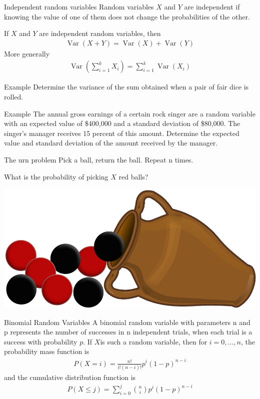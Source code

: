 \documentclass{beamer}
\newcommand{\Var}{\operatorname{Var}}
\begin{document}
\begin{frame}{Independent random variables}
  Random variables $X$ and $Y$ are \alert{independent} if knowing the value of one of them
  does not change the probabilities of the other.

  If $X$ and $Y$ are independent random variables, then
  \begin{align*}
    \Var(X + Y) = \Var(X) + \Var(Y )
  \end{align*}
  More generally
  \begin{align*}
    \Var\left( \sum_{i=1}^k X_i \right) = \sum_{i=1}^k \Var (X_i)
  \end{align*}
\end{frame}

\begin{frame}[t]{Example}
  Determine the variance of the sum obtained when a pair of fair dice is rolled.
\end{frame}

\begin{frame}[t]{Example}
  The annual gross earnings of a certain rock singer are a random variable with
  an expected value of \$400,000 and a standard deviation of \$80,000. The
  singer’s manager receives 15 percent of this amount. Determine the expected
  value and standard deviation of the amount received by the manager.
\end{frame}

\begin{frame}{The urn problem}
  Pick a ball, return the ball. Repeat n times.

  What is the probability of picking $X$ red balls?

  \includegraphics[width=\linewidth]{urn2_small}
\end{frame}

\begin{frame}{Binomial Random Variables}
  A \alert{binomial random variable} with parameters \alert{n} and \alert{p}
  represents the number of \alert{successes} in \alert{n} independent
  \alert{trials}, when each trial is a success with probability $p$.  If $X$is
  such a random variable, then for $i = 0, \ldots , n$, the probability mass
  function is
  \begin{align*}
    P(X=i) = \frac{n!}{i!(n-i)!}p^i {(1-p)}^{n-i}
  \end{align*}
  and the cumulative distribution function is
  \begin{align*}
    P(X \leq j) = \sum_{i=0}^j \binom n i p^i {(1-p)}^{n-i}
  \end{align*}
\end{frame}
\end{document}
